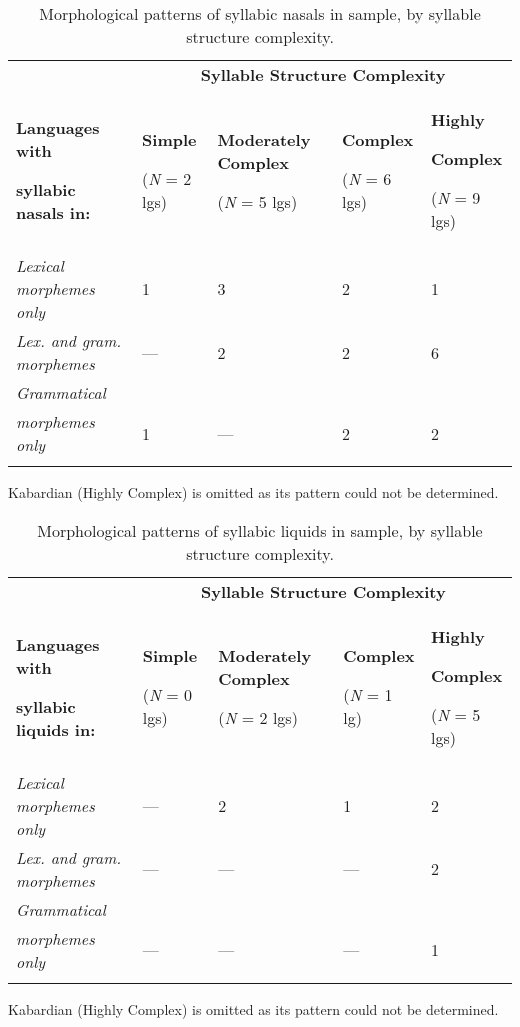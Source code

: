 \begin{table}
\begin{tabularx}{\textwidth}{XXXXX}
 & \multicolumn{4}{c}{ \textbf{Syllable Structure Complexity}}\\
\lsptoprule
{ \textbf{Languages with} }

 \textbf{syllabic nasals in:} & { \textbf{Simple}}

 (\textit{N} = 2 lgs) & { \textbf{Moderately Complex}}

 (\textit{N} = 5 lgs) & { \textbf{Complex}}

 (\textit{N} = 6 lgs) & { \textbf{Highly} }

{ \textbf{Complex}}

 (\textit{N} = 9 lgs)\\
 \textit{Lexical morphemes only} & 1 & 3 & 2 & 1\\
 \textit{Lex. and gram. morphemes} & — & 2 & 2 & 6\\
 \textit{Grammatical} \\
\textit{morphemes only} & 1 & — & 2 & 2\\
\lspbottomrule
\end{tabularx}
\caption{\label{tab:3.9}Morphological patterns of syllabic nasals in sample, by syllable structure complexity.}Kabardian (Highly Complex) is omitted as its pattern could not be determined.
\end{table}




\begin{table}
\begin{tabularx}{\textwidth}{XXXXX}
 & \multicolumn{4}{c}{ \textbf{Syllable Structure Complexity}}\\
\lsptoprule
{ \textbf{Languages with} }

 \textbf{syllabic liquids in:} & { \textbf{Simple}}

 (\textit{N} = 0 lgs) & { \textbf{Moderately Complex}}

 (\textit{N} = 2 lgs) & { \textbf{Complex}}

 (\textit{N} = 1 lg) & { \textbf{Highly} }

{ \textbf{Complex}}

 (\textit{N} = 5 lgs)\\
 \textit{Lexical morphemes only} & — & 2 & 1 & 2\\
 \textit{Lex. and gram. morphemes} & — & — & — & 2\\
 \textit{Grammatical} \\
\textit{morphemes only} & — & — & — & 1\\
\lspbottomrule
\end{tabularx}
\caption{\label{tab:3.10}Morphological patterns of syllabic liquids in sample, by syllable structure complexity.}Kabardian (Highly Complex) is omitted as its pattern could not be determined.
\end{table}





